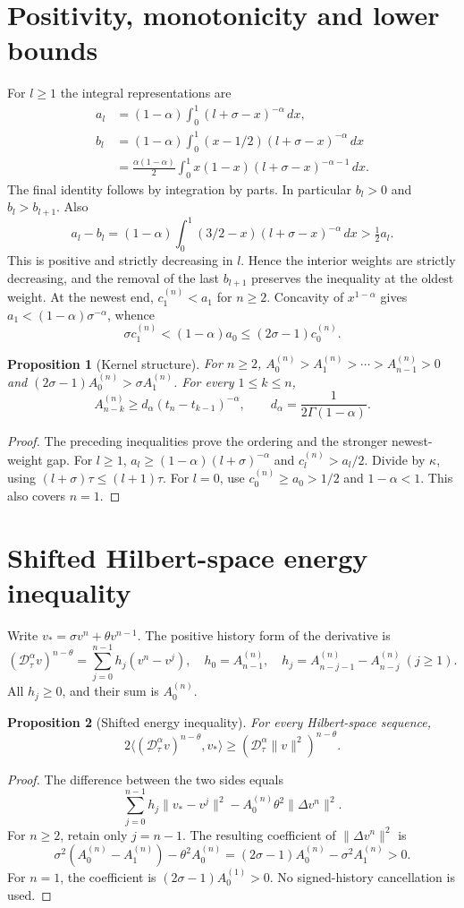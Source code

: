 \documentclass[11pt,a4paper]{article}
\newtheorem{proposition}{Proposition}
\newcommand{\norm}[1]{\lVert#1\rVert}
\newcommand{\D}{\mathcal D_\tau^\alpha}
\begin{document}
\section{Positivity, monotonicity and lower bounds}
For $l\ge1$ the integral representations are
\begin{align*}
 a_l&=(1-\alpha)\int_0^1(l+\sigma-x)^{-\alpha}\,dx,\\
 b_l&=(1-\alpha)\int_0^1(x-1/2)(l+\sigma-x)^{-\alpha}\,dx\\
 &=\frac{\alpha(1-\alpha)}2\int_0^1 x(1-x)(l+\sigma-x)^{-\alpha-1}\,dx.
\end{align*}
The final identity follows by integration by parts. In particular $b_l>0$ and $b_l>b_{l+1}$. Also
\[
 a_l-b_l=(1-\alpha)\int_0^1(3/2-x)(l+\sigma-x)^{-\alpha}\,dx>\tfrac12 a_l.
\]
This is positive and strictly decreasing in $l$. Hence the interior weights are strictly decreasing, and the removal of the last $b_{l+1}$ preserves the inequality at the oldest weight. At the newest end, $c_1^{(n)}<a_1$ for $n\ge2$. Concavity of $x^{1-\alpha}$ gives $a_1<(1-\alpha)\sigma^{-\alpha}$, whence
\[
 \sigma c_1^{(n)}< (1-\alpha)a_0\le(2\sigma-1)c_0^{(n)}.
\]
\begin{proposition}[Kernel structure]
For $n\ge2$, $A_0^{(n)}>A_1^{(n)}>\cdots>A_{n-1}^{(n)}>0$ and $(2\sigma-1)A_0^{(n)}>\sigma A_1^{(n)}$. For every $1\le k\le n$,
\[
 A_{n-k}^{(n)}\ge d_\alpha(t_n-t_{k-1})^{-\alpha},\qquad d_\alpha=\frac1{2\Gamma(1-\alpha)}.
\]
\end{proposition}
\begin{proof}
The preceding inequalities prove the ordering and the stronger newest-weight gap. For $l\ge1$, $a_l\ge(1-\alpha)(l+\sigma)^{-\alpha}$ and $c_l^{(n)}>a_l/2$. Divide by $\kappa$, using $(l+\sigma)\tau\le(l+1)\tau$. For $l=0$, use $c_0^{(n)}\ge a_0>1/2$ and $1-\alpha<1$. This also covers $n=1$.
\end{proof}
\section{Shifted Hilbert-space energy inequality}
Write $v_*=\sigma v^n+\theta v^{n-1}$. The positive history form of the derivative is
\[
 (\D v)^{n-\theta}=\sum_{j=0}^{n-1}h_j(v^n-v^j),
 \quad h_0=A_{n-1}^{(n)},\quad h_j=A_{n-j-1}^{(n)}-A_{n-j}^{(n)}\ (j\ge1).
\]
All $h_j\ge0$, and their sum is $A_0^{(n)}$.
\begin{proposition}[Shifted energy inequality]
For every Hilbert-space sequence,
\[
 2\langle (\D v)^{n-\theta},v_*\rangle\ge (\D\norm{v}^2)^{n-\theta}.
\]
\end{proposition}
\begin{proof}
The difference between the two sides equals
\[
 \sum_{j=0}^{n-1}h_j\norm{v_*-v^j}^2-A_0^{(n)}\theta^2\norm{\Delta v^n}^2.
\]
For $n\ge2$, retain only $j=n-1$. The resulting coefficient of $\norm{\Delta v^n}^2$ is
\[
 \sigma^2(A_0^{(n)}-A_1^{(n)})-\theta^2 A_0^{(n)}
 =(2\sigma-1)A_0^{(n)}-\sigma^2 A_1^{(n)}>0.
\]
For $n=1$, the coefficient is $(2\sigma-1)A_0^{(1)}>0$. No signed-history cancellation is used.
\end{proof}
\end{document}

